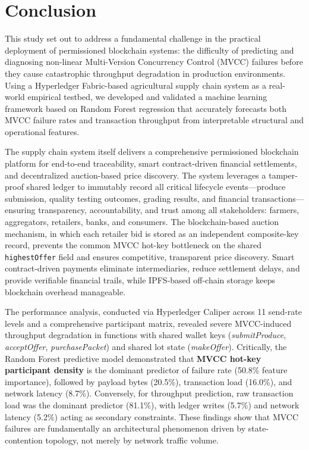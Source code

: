 \documentclass[manuscript,screen,nofonts]{acmart}
\begin{document}
\section{Conclusion}
	
	This study set out to address a fundamental challenge in the practical deployment of permissioned blockchain systems: the difficulty of predicting and diagnosing non-linear Multi-Version Concurrency Control (MVCC) failures before they cause catastrophic throughput degradation in production environments. Using a Hyperledger Fabric-based agricultural supply chain system as a real-world empirical testbed, we developed and validated a machine learning framework based on Random Forest regression that accurately forecasts both MVCC failure rates and transaction throughput from interpretable structural and operational features.
	
	The supply chain system itself delivers a comprehensive permissioned blockchain platform for end-to-end traceability, smart contract-driven financial settlements, and decentralized auction-based price discovery. The system leverages a tamper-proof shared ledger to immutably record all critical lifecycle events—produce submission, quality testing outcomes, grading results, and financial transactions—ensuring transparency, accountability, and trust among all stakeholders: farmers, aggregators, retailers, banks, and consumers. The blockchain-based auction mechanism, in which each retailer bid is stored as an independent composite-key record, prevents the common MVCC hot-key bottleneck on the shared \texttt{highestOffer} field and ensures competitive, transparent price discovery. Smart contract-driven payments eliminate intermediaries, reduce settlement delays, and provide verifiable financial trails, while IPFS-based off-chain storage keeps blockchain overhead manageable.
	
	The performance analysis, conducted via Hyperledger Caliper across 11 send-rate levels and a comprehensive participant matrix, revealed severe MVCC-induced throughput degradation in functions with shared wallet keys (\textit{submitProduce}, \textit{acceptOffer}, \textit{purchasePacket}) and shared lot state (\textit{makeOffer}). Critically, the Random Forest predictive model demonstrated that \textbf{MVCC hot-key participant density} is the dominant predictor of failure rate (50.8\% feature importance), followed by payload bytes (20.5\%), transaction load (16.0\%), and network latency (8.7\%). Conversely, for throughput prediction, raw transaction load was the dominant predictor (81.1\%), with ledger writes (5.7\%) and network latency (5.2\%) acting as secondary constraints. These findings show that MVCC failures are fundamentally an architectural phenomenon driven by state-contention topology, not merely by network traffic volume.
	
\end{document}
